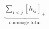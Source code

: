 \documentclass[preview]{standalone}
\begin{document}
\begin{align*}
\underbrace{\sum_{i<j}[h_{ij}]_+}_{\text{dommage futur}}
\end{align*}
\end{document}
